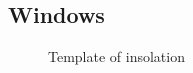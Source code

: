 \subsection*{Windows}

\begin{figure}
	\centering
	\caption{Template of insolation}
	\label{fig:cora_inso}
\end{figure}